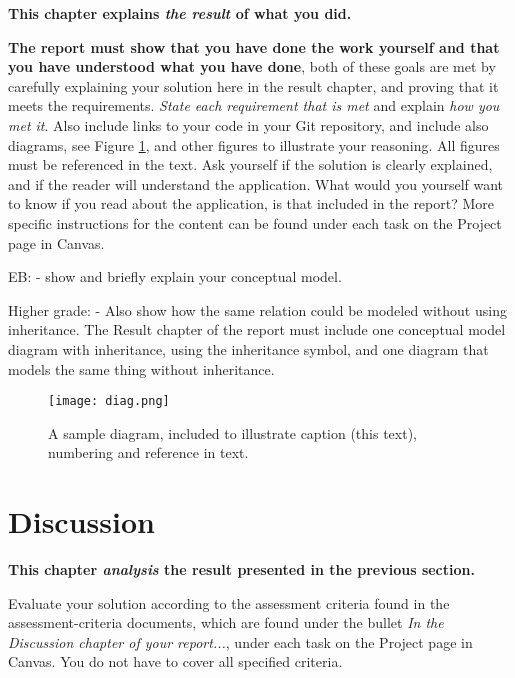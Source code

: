 \documentclass[a4paper]{scrartcl}
\begin{document}
\textbf{This chapter explains \textit{the result} of what you did.}

\textbf{The report must show that you have done the work yourself and that you have understood what you have done}, both of these goals are met by carefully explaining your solution here in the result chapter, and proving that it meets the requirements. \textit{State each requirement that is met} and explain \textit{how you met it}. Also include links to your code in your Git repository, and include also diagrams, see Figure \ref{fig:diag}, and other figures to illustrate your reasoning. All figures must be referenced in the text. Ask yourself if the solution is clearly explained, and if the reader will understand the application. What would you yourself want to know if you read about the application, is that included in the report? More specific instructions for the content can be found under each task on the Project page in Canvas. 

EB:
- show and briefly explain your conceptual model.

Higher grade: 
- Also show how the same relation could be modeled without using inheritance. The Result chapter of the report must include one conceptual model diagram with inheritance, using the inheritance symbol, and one diagram that models the same thing without inheritance. 


\begin{figure}[h!]
  \begin{center}
    \texttt{[image: diag.png]}
    \caption{A sample diagram, included to illustrate caption (this text), numbering and reference in text.}
    \label{fig:diag}
  \end{center}
\end{figure}

\pagebreak

\section{Discussion}

\textbf{This chapter \textit{analysis} the result presented in the previous section.} 

Evaluate your solution according to the assessment criteria found in the assessment-criteria documents, which are found under the bullet \textit{In the Discussion chapter of your report...}, under each task on the Project page in Canvas. You do not have to cover all specified criteria.
\end{document}

